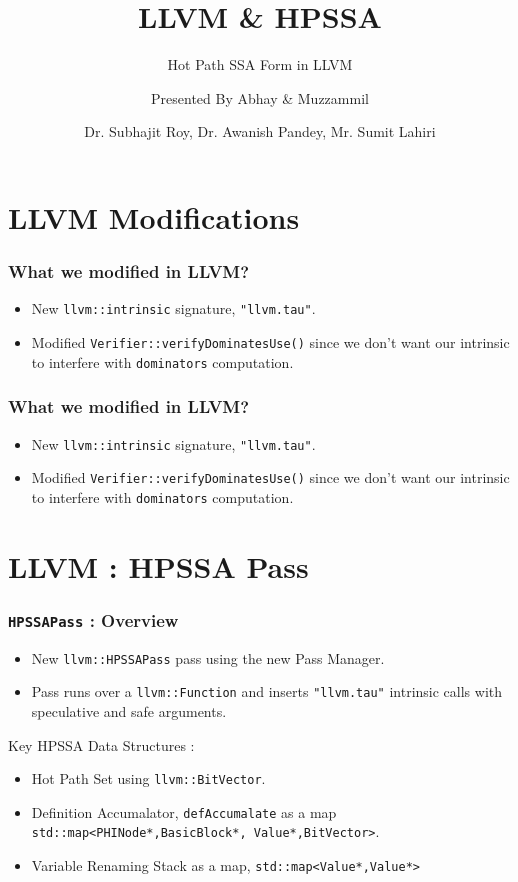 \documentclass{beamer}
\title[\url{https://google.com}] %
{LLVM \& HPSSA}
\subtitle{Hot Path SSA Form in LLVM}
\author[VIP1 \& VIP2] %
{Presented By Abhay\inst{1} \& Muzzammil\inst{1}}
\institute[IDK] %
{
	\inst{1}%
	IIT Kanpur\\
	PRAISE Group
}
\date[01/03/2022] %
{Dr. Subhajit Roy, Dr. Awanish Pandey, Mr. Sumit Lahiri}
\begin{document}
\frame{\titlepage}

\section{LLVM Modifications}

\begin{frame}
	\frametitle{What we modified in LLVM?}
	\begin{itemize}
		\item New \texttt{llvm::intrinsic} signature, \texttt{"llvm.tau"}.
		\item Modified \texttt{Verifier::verifyDominatesUse()} since we don't want our intrinsic to interfere with \texttt{dominators} computation.  
	\end{itemize}
\end{frame}

\begin{frame}
	\frametitle{What we modified in LLVM?}
	\begin{itemize}
		\item New \texttt{llvm::intrinsic} signature, \texttt{"llvm.tau"}.
		\item Modified \texttt{Verifier::verifyDominatesUse()} since we don't want our intrinsic to interfere with \texttt{dominators} computation.  
	\end{itemize}
\end{frame}


\section{LLVM : HPSSA Pass}

\begin{frame}
	\frametitle{\texttt{HPSSAPass} : Overview}
	\begin{itemize}
		\item New \texttt{llvm::HPSSAPass} pass using the new Pass Manager. 
		\item Pass runs over a \texttt{llvm::Function} and inserts \texttt{"llvm.tau"} intrinsic calls with speculative and safe arguments.
	\end{itemize}
	Key HPSSA Data Structures :  
	\begin{itemize}
		\item Hot Path Set using \texttt{llvm::BitVector}.
		\item Definition Accumalator, \texttt{defAccumalate} as a map  \texttt{std::map<{PHINode*,BasicBlock*}, {Value*,BitVector}>}.
		\item Variable Renaming Stack as a map, \texttt{std::map<Value*,Value*>}
	\end{itemize}
\end{frame}
\end{document}
